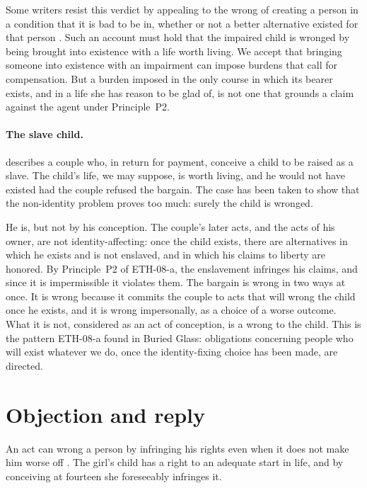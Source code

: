 \documentclass{situationist-preprint}
\begin{document}
Some writers resist this verdict by appealing to the wrong of creating a person in a condition that it is bad to be in, whether or not a better alternative existed for that person \citep{Shiffrin1999}. Such an account must hold that the impaired child is wronged by being brought into existence with a life worth living. We accept that bringing someone into existence with an impairment can impose burdens that call for compensation. But a burden imposed in the only course in which its bearer exists, and in a life she has reason to be glad of, is not one that grounds a claim against the agent under Principle~P2.

\paragraph{The slave child.} \citet{Kavka1982} describes a couple who, in return for payment, conceive a child to be raised as a slave. The child's life, we may suppose, is worth living, and he would not have existed had the couple refused the bargain. The case has been taken to show that the non-identity problem proves too much: surely the child is wronged.

He is, but not by his conception. The couple's later acts, and the acts of his owner, are not identity-affecting: once the child exists, there are alternatives in which he exists and is not enslaved, and in which his claims to liberty are honored. By Principle~P2 of ETH-08-a, the enslavement infringes his claims, and since it is impermissible it violates them. The bargain is wrong in two ways at once. It is wrong because it commits the couple to acts that will wrong the child once he exists, and it is wrong impersonally, as a choice of a worse outcome. What it is not, considered as an act of conception, is a wrong to the child. This is the pattern ETH-08-a found in Buried Glass: obligations concerning people who will exist whatever we do, once the identity-fixing choice has been made, are directed.

\section{Objection and reply}

\begin{objection}
An act can wrong a person by infringing his rights even when it does not make him worse off \citep{Woodward1986}. The girl's child has a right to an adequate start in life, and by conceiving at fourteen she foreseeably infringes it.
\end{objection}
\end{document}
